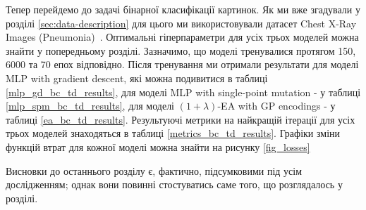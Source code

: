 Тепер перейдемо до задачі бінарної класифікації картинок. Як ми вже згадували у розділі \ref{sec:data-description} для цього ми використовували датасет Chest X-Ray Images (Pneumonia)~\cite{ct32}. Оптимальні гіперпараметри для усіх трьох моделей можна знайти у попередньому розділі. Зазначимо, що моделі тренувалися протягом 150, 6000 та 70 епох відповідно. Після тренування ми отримали результати для моделі MLP with gradient descent, які можна подивитися в таблиці \ref{mlp_gd_bc_td_results}, для моделі MLP with single-point mutation - у таблиці \ref{mlp_spm_bc_td_results}, для моделі $(1+\lambda)$-EA with GP encodings - у таблиці \ref{ea_bc_td_results}. Результуючі метрики на найкращій ітерації для усіх трьох моделей знаходяться в таблиці \ref{metrics_bc_td_results}. Графіки зміни функцій втрат для кожної моделі можна знайти на рисунку \ref{fig_losses}

\chapconclude{\ref{chap:practice}}

Висновки до останнього розділу є, фактично, підсумковими під усім 
дослідженням; однак вони повинні стостуватись саме того, що розглядалось у 
розділі.